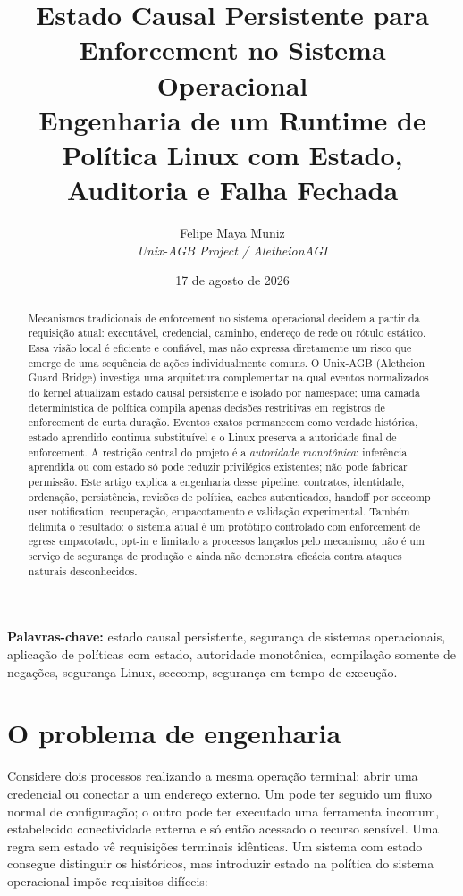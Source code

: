 \documentclass[11pt,a4paper]{article}
\title{Estado Causal Persistente para Enforcement no Sistema Operacional\\
\large Engenharia de um Runtime de Política Linux com Estado, Auditoria e Falha Fechada}
\author{
Felipe Maya Muniz\\
\textit{Unix-AGB Project / AletheionAGI}
}
\date{17 de agosto de 2026}
\begin{document}
\maketitle

\begin{abstract}
Mecanismos tradicionais de enforcement no sistema operacional decidem a partir
da requisição atual: executável, credencial, caminho, endereço de rede ou rótulo
estático. Essa visão local é eficiente e confiável, mas não expressa diretamente
um risco que emerge de uma sequência de ações individualmente comuns. O Unix-AGB
(Aletheion Guard Bridge) investiga uma arquitetura complementar na qual eventos
normalizados do kernel atualizam estado causal persistente e isolado por
namespace; uma camada determinística de política compila apenas decisões
restritivas em registros de enforcement de curta duração. Eventos exatos
permanecem como verdade histórica, estado aprendido continua substituível e o
Linux preserva a autoridade final de enforcement. A restrição central do
projeto é a \emph{autoridade monotônica}: inferência aprendida ou com estado só
pode reduzir privilégios existentes; não pode fabricar permissão. Este artigo
explica a engenharia desse pipeline: contratos, identidade, ordenação, persistência,
revisões de política, caches autenticados, handoff por seccomp user notification,
recuperação, empacotamento e validação experimental. Também delimita o resultado:
o sistema atual é um protótipo controlado com enforcement de egress empacotado,
opt-in e limitado a processos lançados pelo mecanismo; não é um serviço de
segurança de produção e ainda não demonstra eficácia contra ataques naturais
desconhecidos.
\end{abstract}

\noindent\textbf{Palavras-chave:}
estado causal persistente,
segurança de sistemas operacionais,
aplicação de políticas com estado,
autoridade monotônica,
compilação somente de negações,
segurança Linux,
seccomp,
segurança em tempo de execução.

\section{O problema de engenharia}

Considere dois processos realizando a mesma operação terminal: abrir uma
credencial ou conectar a um endereço externo. Um pode ter seguido um fluxo
normal de configuração; o outro pode ter executado uma ferramenta incomum,
estabelecido conectividade externa e só então acessado o recurso sensível. Uma
regra sem estado vê requisições terminais idênticas. Um sistema com estado
consegue distinguir os históricos, mas introduzir estado na política do sistema
operacional impõe requisitos difíceis:
\end{document}
